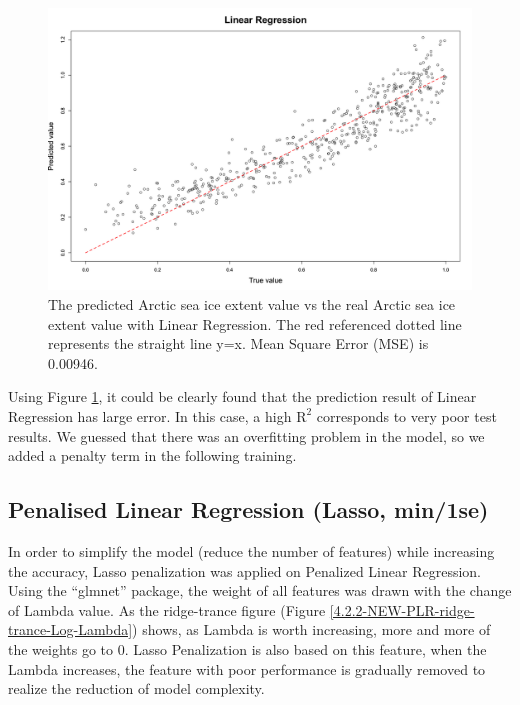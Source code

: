 \begin{figure}[htbp]
\centering
\includegraphics[width = 1.0\textwidth]{Figure/4.2.1-LR.png}
\caption{The predicted Arctic sea ice extent value vs the real Arctic sea ice extent value with Linear Regression. The red referenced dotted line represents the straight line y=x. Mean Square Error (MSE) is 0.00946.}
\label{4.2.1-LR}
\end{figure}


Using Figure \ref{4.2.1-LR}, it could be clearly found that the prediction result of Linear Regression has large error. In this case, a high $\text{R}^2$ corresponds to very poor test results. We guessed that there was an overfitting problem in the model, so we added a penalty term in the following training.



\subsection{Penalised Linear Regression (Lasso, min/1se)} %

In order to simplify the model (reduce the number of features) while increasing the accuracy, Lasso penalization was applied on Penalized Linear Regression. Using the “glmnet” package, the weight of all features was drawn with the change of Lambda value. As the ridge-trance figure (Figure \ref{4.2.2-NEW-PLR-ridge-trance-Log-Lambda}) shows, as Lambda is worth increasing, more and more of the weights go to 0. Lasso Penalization is also based on this feature, when the Lambda increases, the feature with poor performance is gradually removed to realize the reduction of model complexity. 



